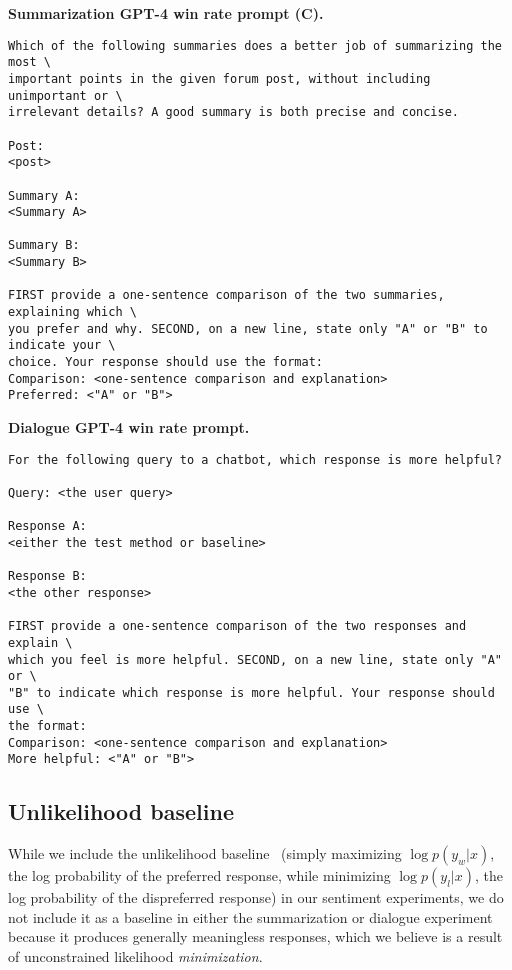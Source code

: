 \documentclass{article}
\begin{document}
\textbf{Summarization GPT-4 win rate prompt (C).}
\begin{verbatim}
Which of the following summaries does a better job of summarizing the most \ 
important points in the given forum post, without including unimportant or \ 
irrelevant details? A good summary is both precise and concise.

Post:
<post>

Summary A:
<Summary A>

Summary B:
<Summary B>

FIRST provide a one-sentence comparison of the two summaries, explaining which \
you prefer and why. SECOND, on a new line, state only "A" or "B" to indicate your \ 
choice. Your response should use the format:
Comparison: <one-sentence comparison and explanation>
Preferred: <"A" or "B">
\end{verbatim}

\textbf{Dialogue GPT-4 win rate prompt.}
\begin{verbatim}
For the following query to a chatbot, which response is more helpful?

Query: <the user query>

Response A:
<either the test method or baseline>

Response B:
<the other response>

FIRST provide a one-sentence comparison of the two responses and explain \
which you feel is more helpful. SECOND, on a new line, state only "A" or \
"B" to indicate which response is more helpful. Your response should use \
the format:
Comparison: <one-sentence comparison and explanation>
More helpful: <"A" or "B">
\end{verbatim}

\subsection{Unlikelihood baseline}
While we include the unlikelihood baseline~\citep{welleck2019neural} (simply maximizing $\log p(y_w|x)$, the log probability of the preferred response, while minimizing $\log p(y_l|x)$, the log probability of the dispreferred response) in our sentiment experiments, we do not include it as a baseline in either the summarization or dialogue experiment because it produces generally meaningless responses, which we believe is a result of unconstrained likelihood \textit{minimization}. 
\end{document}
